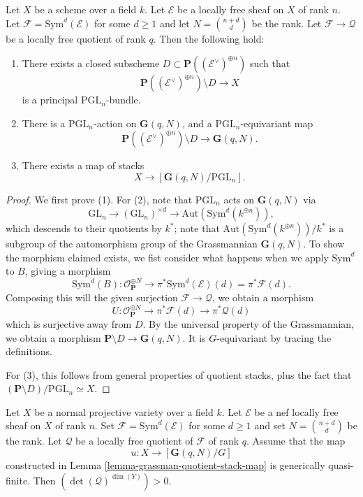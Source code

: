 \begin{lemma}
\label{lemma-grassman-quotient-stack-map}
Let $X$ be a scheme over a field $k$.
Let $\mathcal{E}$ be a locally free sheaf on $X$ of rank $n$.
Let $\mathcal{F} = \mathrm{Sym}^d(\mathcal{E})$ for some $d \geq 1$ and
let $N = \binom{n + d}{d}$ be the rank.
Let $\mathcal{F} \to \mathcal{Q}$ be a locally free quotient of rank $q$.
Then the following hold:
\begin{enumerate}
\item There exists a closed subscheme
  $D \subset \mathbf{P}((\mathcal{E}^\vee)^{\oplus n})$ such that
$$
\mathbf{P}((\mathcal{E}^\vee)^{\oplus n}) \setminus D \longrightarrow X
$$
is a principal $\mathrm{PGL}_n$-bundle.
\item There is a $\mathrm{PGL}_n$-action on $\mathbf{G}(q,N)$, and
a $\mathrm{PGL}_n$-equivariant map
$$
\mathbf{P}((\mathcal{E}^\vee)^{\oplus n}) \setminus D \longrightarrow
\mathbf{G}(q,N).
$$
\item There exists a map of stacks
$$
X \longrightarrow [\mathbf{G}(q,N)/\mathrm{PGL}_n].
$$
\end{enumerate}
\end{lemma}
\begin{proof}
We first prove (1).
For (2), note that $\mathrm{PGL}_n$ acts on $\mathbf{G}(q,N)$ via
$$
  \mathrm{GL}_n \longrightarrow
  (\mathrm{GL}_n)^{\times d} \longrightarrow
  \mathrm{Aut}(\mathrm{Sym}^d (k^{\oplus n})),
$$
which descends to their quotients by $k^*$; note that
$\mathrm{Aut}(\mathrm{Sym}^d (k^{\oplus n}))/k^*$ is a subgroup of the
automorphism group of the Grassmannian $\mathbf{G}(q,N)$.
To show the morphism claimed exists, we fist consider what happens when we
apply $\mathrm{Sym}^d$ to $B$, giving a morphism
$$
  \mathrm{Sym}^d(B) : \mathcal{O}_{\mathbf{P}}^{\oplus N} \to
    \pi^*\mathrm{Sym}^d(\mathcal{E})(d) = \pi^*\mathcal{F}(d).
$$
Composing this will the given surjection $\mathcal{F} \to \mathcal{Q}$, we
obtain a morphism
$$
  U : \mathcal{O}_{\mathbf{P}}^{\oplus N} \to
        \pi^*\mathcal{F}(d) \to
        \pi^*\mathcal{Q}(d)
$$
which is surjective away from $D$.
By the universal property of the Grassmannian, we obtain a morphism
$\mathbf{P} \setminus D \to \mathbf{G}(q,N)$.
It is $G$-equivariant by tracing the definitions.

For (3), this follows from general properties of quotient stacks, plus the fact
that $(\mathbf{P} \setminus D)/\mathrm{PGL}_n \simeq X$.
\end{proof}

\begin{lemma}
\label{lemma-positive-self-intersection}
Let $X$ be a normal projective variety over a field $k$.
Let $\mathcal{E}$ be a nef locally free sheaf on $X$ of rank $n$.
Set $\mathcal{F} = \mathrm{Sym}^d(\mathcal{E})$ for some $d \geq 1$ and set
$N = \binom{n + d}{d}$ be the rank.
Let $\mathcal{Q}$ be a locally free quotient of $\mathcal{F}$ of rank $q$.
Assume that the map
$$
  u : X \to [\mathbf{G}(q,N)/G]
$$
constructed in Lemma \ref{lemma-grassman-quotient-stack-map}
is generically quasi-finite.
Then $(\det(\mathcal{Q})^{\dim(Y)}) > 0$.
\end{lemma}

